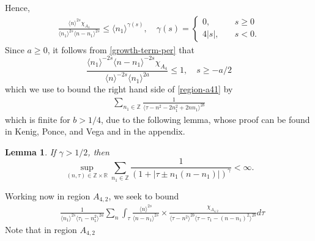 \documentclass[12pt,reqno]{amsart}
\numberwithin{equation}{section}  %
\newcommand{\rr}{\mathbb{R}}
\newcommand{\zz}{\mathbb{Z}}
\newtheorem{lemma}[theorem]{Lemma}
\begin{document}
%
Hence,
%
\begin{equation}
  \label{growth-term-per}
\begin{split}
  \frac{\langle n \rangle ^{2s} \chi_{A_{4}}}{\langle n_{1} \rangle ^{2s} \langle n -
  n_{1} \rangle ^{2s}} \le \langle n_{1} \rangle ^{\gamma(s)},
  \quad 
  \gamma(s) = 
  \begin{cases} 0, \quad & s \ge 0
    \\
    4|s|, \quad & s < 0.
  \end{cases}
\end{split}
\end{equation}
%
%
%
%
Since $a \ge 0$, it follows from \eqref{growth-term-per} that 
%
\begin{equation}
  \label{growth-term-control-per}
  \frac{\langle n_1 \rangle ^{-2s} \langle n - n_{1} \rangle
  ^{-2s}\chi_{A_{4}}}{\langle
n \rangle ^{-2s} \langle n_{1} \rangle
^{2a}} \le 1, \quad s \ge -a/2
\end{equation}
%
%
which we use to bound the right hand side of \eqref{region-a41} by
%
%
\begin{equation*}
\begin{split}
\sum_{n_{1} \in
\zz} 
\frac{1}{\langle \tau - n^{2} - 2n_{1}^{2} + 2nn_{1}  \rangle^{2b} }
\end{split}
\end{equation*}
%
%
%
which is finite for $b > 1/4$, due to the following lemma, whose proof can be found in
Kenig, Ponce, and Vega
\cite{Kenig-Ponce-Vega-1996-Quadratic-forms-for-the-1-D-semilinear} and in the
appendix.
\begin{lemma}
  \label{lem:sum-estimate}
If $\gamma>1/2$, then
\begin{equation}\label{CI2}
\sup_{(n,\tau)\in \zz \times \rr}\sum_{n_1\in \zz}\frac{1}{(1+|\tau\pm
n_1(n-n_1)|)^{\gamma}}<\infty. 
\end{equation}
\end{lemma}
%
Working now in region $A_{4,2}$, we seek to bound 
\begin{equation}
  \label{region-4-2}
\begin{split}
  &  \frac{1}{\langle n_{1} \rangle ^{2s}
  \langle \tau_{1} - n_{1}^{2} \rangle
  ^{2a}} \sum_{n} \int_{\tau} \frac{\langle n \rangle ^{2s}}{\langle
  n - n_{1}\rangle ^{2s}}  \times \frac{\chi_{A_{4,2}}}{\langle
  \tau - n^{2} \rangle^{2b}  \langle \tau - \tau_{1} - (n - n_{1})^{2} \rangle^{2b} } d \tau 
\end{split}
\end{equation}
%
%
Note that in region $A_{4,2}$
\end{document}
